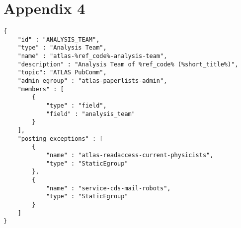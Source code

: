 \section*{Appendix 4}
\label{sec:app4}

\begin{lstlisting}
{
    "id" : "ANALYSIS_TEAM",
    "type" : "Analysis Team",
    "name" : "atlas-%ref_code%-analysis-team",
    "description" : "Analysis Team of %ref_code% (%short_title%)",
    "topic": "ATLAS PubComm",
    "admin_egroup" : "atlas-paperlists-admin",
    "members" : [
        {
            "type" : "field",
            "field" : "analysis_team"
        }
    ],
    "posting_exceptions" : [
        {
            "name" : "atlas-readaccess-current-physicists",
            "type" : "StaticEgroup"
        },
        {
            "name" : "service-cds-mail-robots",
            "type" : "StaticEgroup"
        }
    ]
}

\end{lstlisting}